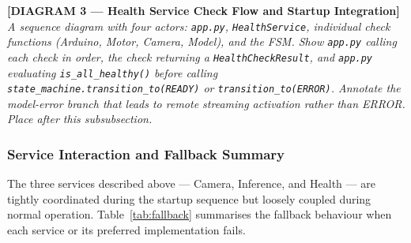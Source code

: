 \bigskip
\noindent\textbf{[DIAGRAM 3 — Health Service Check Flow and Startup
	Integration]}\\
\textit{A sequence diagram with four actors: \texttt{app.py},
	\texttt{HealthService}, individual check functions (Arduino, Motor,
	Camera, Model), and the FSM. Show \texttt{app.py} calling each check
	in order, the check returning a \texttt{HealthCheckResult}, and
	\texttt{app.py} evaluating \texttt{is\_all\_healthy()} before calling
	\texttt{state\_machine.transition\_to(READY)} or
	\texttt{transition\_to(ERROR)}. Annotate the model-error branch that
	leads to remote streaming activation rather than ERROR. Place after
	this subsubsection.}
\bigskip


\subsubsection{Service Interaction and Fallback Summary}
\label{sec:service_fallback}

The three services described above — Camera, Inference, and Health —
are tightly coordinated during the startup sequence but loosely
coupled during normal operation. Table~\ref{tab:fallback} summarises
the fallback behaviour when each service or its preferred
implementation fails.

